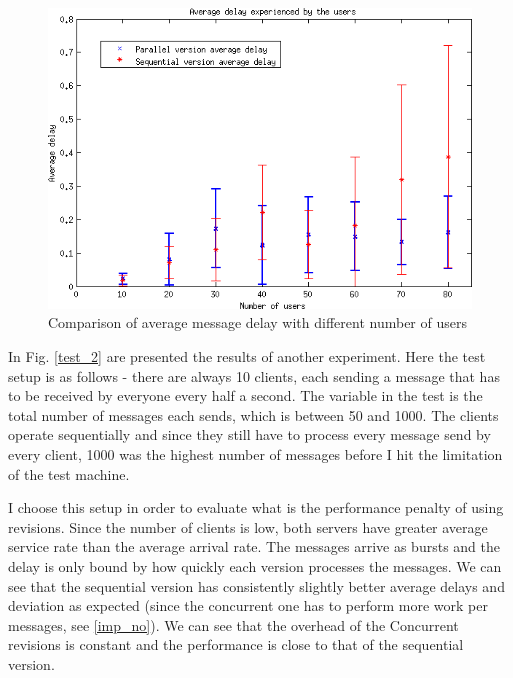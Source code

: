 \documentclass[12pt,twoside,notitlepage]{report}
\begin{document}
    
\begin{figure}[ht!]
\centering
\includegraphics[width=135mm]{plot_users.png}
\caption{Comparison of average message delay with different number of users}
\label{test_1}
\end{figure}


In Fig. \ref{test_2} are presented the results of another experiment. Here the test setup is as follows - there are always 10 clients, each sending a message that has to be received by everyone every half a second. The variable in the test is the total number of messages each sends, which is between 50 and 1000. The clients operate sequentially and since they still have to process every message send by every client, 1000 was the highest number of messages before I hit the limitation of the test machine.  

I choose this setup in order to evaluate what is the performance penalty of using revisions. Since the number of clients is low, both servers have greater average service rate than the average arrival rate. The messages arrive as bursts and the delay is only bound by how quickly each version processes the messages. We can see that the sequential version has consistently slightly better average delays and deviation as expected (since the concurrent one has to perform more work per messages, see \ref{imp_no}). We can see that the overhead of the Concurrent revisions is constant and the performance is close to that of the sequential version.
  
\end{document}
